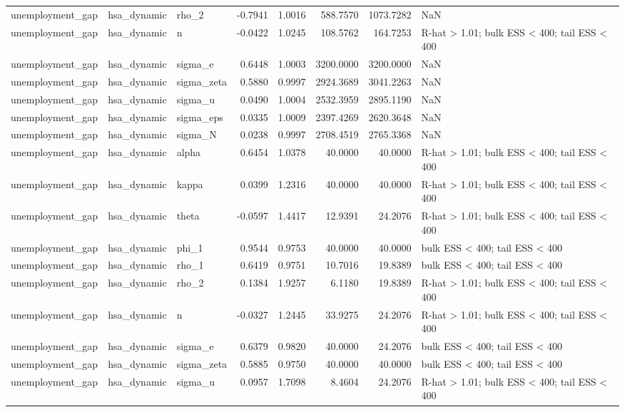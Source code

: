 \begin{tabular}{lllrrrrl}
unemployment\_gap & hsa\_dynamic & rho\_2 & -0.7941 & 1.0016 & 588.7570 & 1073.7282 & NaN \\
unemployment\_gap & hsa\_dynamic & n & -0.0422 & 1.0245 & 108.5762 & 164.7253 & R-hat > 1.01; bulk ESS < 400; tail ESS < 400 \\
unemployment\_gap & hsa\_dynamic & sigma\_e & 0.6448 & 1.0003 & 3200.0000 & 3200.0000 & NaN \\
unemployment\_gap & hsa\_dynamic & sigma\_zeta & 0.5880 & 0.9997 & 2924.3689 & 3041.2263 & NaN \\
unemployment\_gap & hsa\_dynamic & sigma\_u & 0.0490 & 1.0004 & 2532.3959 & 2895.1190 & NaN \\
unemployment\_gap & hsa\_dynamic & sigma\_eps & 0.0335 & 1.0009 & 2397.4269 & 2620.3648 & NaN \\
unemployment\_gap & hsa\_dynamic & sigma\_N & 0.0238 & 0.9997 & 2708.4519 & 2765.3368 & NaN \\
unemployment\_gap & hsa\_dynamic & alpha & 0.6454 & 1.0378 & 40.0000 & 40.0000 & R-hat > 1.01; bulk ESS < 400; tail ESS < 400 \\
unemployment\_gap & hsa\_dynamic & kappa & 0.0399 & 1.2316 & 40.0000 & 40.0000 & R-hat > 1.01; bulk ESS < 400; tail ESS < 400 \\
unemployment\_gap & hsa\_dynamic & theta & -0.0597 & 1.4417 & 12.9391 & 24.2076 & R-hat > 1.01; bulk ESS < 400; tail ESS < 400 \\
unemployment\_gap & hsa\_dynamic & phi\_1 & 0.9544 & 0.9753 & 40.0000 & 40.0000 & bulk ESS < 400; tail ESS < 400 \\
unemployment\_gap & hsa\_dynamic & rho\_1 & 0.6419 & 0.9751 & 10.7016 & 19.8389 & bulk ESS < 400; tail ESS < 400 \\
unemployment\_gap & hsa\_dynamic & rho\_2 & 0.1384 & 1.9257 & 6.1180 & 19.8389 & R-hat > 1.01; bulk ESS < 400; tail ESS < 400 \\
unemployment\_gap & hsa\_dynamic & n & -0.0327 & 1.2445 & 33.9275 & 24.2076 & R-hat > 1.01; bulk ESS < 400; tail ESS < 400 \\
unemployment\_gap & hsa\_dynamic & sigma\_e & 0.6379 & 0.9820 & 40.0000 & 24.2076 & bulk ESS < 400; tail ESS < 400 \\
unemployment\_gap & hsa\_dynamic & sigma\_zeta & 0.5885 & 0.9750 & 40.0000 & 40.0000 & bulk ESS < 400; tail ESS < 400 \\
unemployment\_gap & hsa\_dynamic & sigma\_u & 0.0957 & 1.7098 & 8.4604 & 24.2076 & R-hat > 1.01; bulk ESS < 400; tail ESS < 400 \\

\end{tabular}
